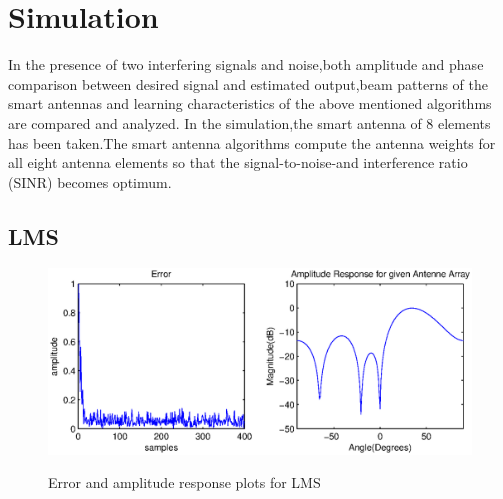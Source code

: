 \pagestyle{fancy}
\fancyhf{}
\rfoot{\thepage}


\chapter{Simulation}

In the presence of two interfering signals and noise,both amplitude and phase comparison between desired signal and estimated output,beam patterns of the smart antennas and learning characteristics of the above mentioned algorithms are compared and analyzed. In the simulation,the smart antenna of 8 elements has been taken.The smart antenna algorithms compute the antenna weights for all eight antenna elements so that the signal-to-noise-and interference ratio (SINR) becomes optimum\cite{ADR3}.



\section{LMS}
\vspace{-0.5cm}
\begin{figure}[!h]
\hspace{-2.9cm}
\includegraphics[scale=1.1]{lms1.eps}
\vspace{-10cm}
{\bf{\caption{Error and amplitude response plots for LMS}}}
\end{figure}



